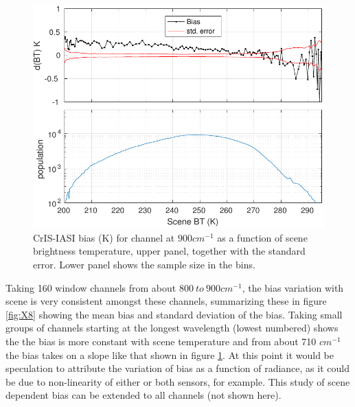 \documentclass[twocolumn,10pt]{article}
\begin{document}
\begin{figure}[htb]
\centering
\includegraphics[width=\linewidth]{./figs/IC_jplSNO_Bias_stdErr_900wn_vsScene_quantile.pdf}
\caption{\label{fig:orgparagraph8}
  CrIS-IASI bias (K) for channel at $900 cm^{-1}$ as a function of scene brightness temperature, upper panel, together with the standard error. Lower panel shows the sample size in the bins.}
\label{fig:X7}
\end{figure}

Taking 160 window channels from about $800\ to\ 900 cm^{-1}$, the bias variation with scene
is very consistent amongst these channels, summarizing these in figure \ref{fig:X8} showing the mean bias and standard deviation of the bias. Taking small groups of channels starting at the longest wavelength (lowest numbered) shows the the bias is more constant with scene temperature and from about 710 $cm^{-1}$ the bias takes on a slope like that shown in figure \ref{fig:X7}. At this point it would be speculation to attribute the variation of bias as a function of radiance, as it could be due to non-linearity of either or both sensors, for example. This study of scene dependent bias can be extended to all channels (not shown here).
\end{document}

